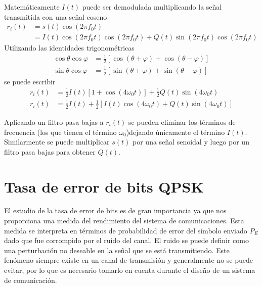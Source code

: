 Matem\'aticamente $I(t)$ puede ser demodulada multiplicando la se\~nal transmitida
con una se\~nal coseno
\begin{equation}
\begin{aligned}
r_i(t)&=s(t)\cos(2\pi f_0t)\\
&=I(t)\cos(2\pi f_0t)\cos(2\pi f_0t)+Q(t)\sin(2\pi f_0t)\cos(2\pi f_0t)
\end{aligned}
\end{equation}
Utilizando las identidades trigonom\'etricas
\begin{equation}
\begin{aligned}
\cos\theta\cos\varphi&=\frac{1}{2}[\cos(\theta+\varphi)+\cos(\theta-\varphi)]\\
\sin\theta\cos\varphi&=\frac{1}{2}[\sin(\theta+\varphi)+\sin(\theta-\varphi)]
\end{aligned}
\end{equation}
se puede escribir
\begin{equation}
\begin{aligned}
r_i(t)&=\frac{1}{2}I(t)[1+\cos(4\omega_0t)]+\frac{1}{2}Q(t)\sin(4\omega_0t)\\
r_i(t)&=\frac{1}{2}I(t)+\frac{1}{2}[I(t)\cos(4\omega_0t)+Q(t)\sin(4\omega_0t)]
\end{aligned}
\end{equation}

Aplicando un filtro pasa bajas a $r_i(t)$ se pueden eliminar los t\'erminos de
frecuencia (los que tienen el t\'ermino $\omega_0$)dejando \'unicamente el
t\'ermino $I(t)$. Similarmente se puede multiplicar $s(t)$ por una se\~nal
senoidal y luego por un filtro pasa bajas para obtener $Q(t)$.

\section{Tasa de error de bits QPSK}
El estudio de la tasa de error de bits es de gran importancia ya que nos proporciona una medida del
rendimiento del sistema de comunicaciones. Esta medida se interpreta en t\'erminos de probabilidad de
error del s\'imbolo enviado $P_E$ dado que fue corrompido por el ruido del canal. El ruido se puede
definir como una perturbaci\'on no deseable en la se\~nal que se est\'a transmitiendo. Este fen\'omeno
siempre existe en un canal de transmisi\'on y generalmente no se puede evitar, por lo que es
necesario tomarlo en cuenta durante el dise\~no de un sistema de comunicaci\'on.

